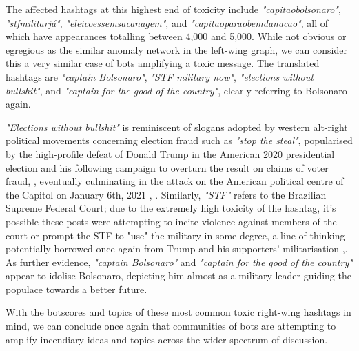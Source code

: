 \documentclass[a4paper,11pt]{article}  %
\begin{document}
	The affected hashtags at this highest end of toxicity include \textit{"capitaobolsonaro"}, \textit{"stfmilitarjá"}, \textit{"eleicoessemsacanagem"}, and \textit{"capitaoparaobemdanacao"}, all of which have appearances totalling between 4,000 and 5,000. While not obvious or egregious as the similar anomaly network in the left-wing graph, we can consider this a very similar case of bots amplifying a toxic message. The translated hashtags are \textit{"captain Bolsonaro"}, \textit{"STF military now"}, \textit{"elections without bullshit"}, and \textit{"captain for the good of the country"}, clearly referring to Bolsonaro again. 
	
	\textit{"Elections without bullshit"} is reminiscent of slogans adopted by western alt-right political movements concerning election fraud such as \textit{"stop the steal"}, popularised by the high-profile defeat of Donald Trump in the American 2020 presidential election\parencite{FederalElections2020a} and his following campaign to overturn the result on claims of voter fraud\parencite{rutenberg77DaysTrump2021}, \parencite{ruparTrumpDesperateSTOP2020}, eventually culminating in the attack on the American political centre of the Capitol on January 6th, 2021 \parencite{JanuaryAttackCapitol}, \parencite{JanuaryCapitolAttack2024}. Similarly, \textit{"STF"} refers to the Brazilian Supreme Federal Court\parencite{STJInternationalSuperior}; due to the extremely high toxicity of the hashtag, it's possible these posts were attempting to incite violence against members of the court or prompt the STF to "use" the military in some degree, a line of thinking potentially borrowed once again from Trump and his supporters' militarisation \parencite{lohStopStealLeader},\parencite{sonmezFrustratedTrumpRedoubles2020}. As further evidence, \textit{"captain Bolsonaro"} and \textit{"captain for the good of the country"} appear to idolise Bolsonaro, depicting him almost as a military leader guiding the populace towards a better future.
	
	With the botscores and topics of these most common toxic right-wing hashtags in mind, we can conclude once again that communities of bots are attempting to amplify incendiary ideas and topics across the wider spectrum of discussion.
	
\end{document}
